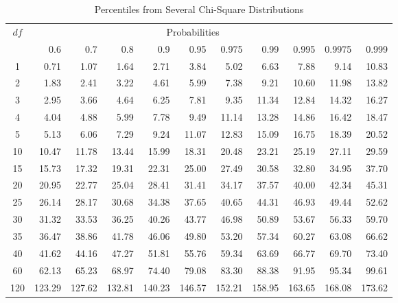\begin{table}[h]
 \caption{\label{AP:ChiSqProbTable} Percentiles from
Several Chi-Square Distributions}
\begin{tabular}{c|rrrrrrrrrr}
\hline   $df$ & \multicolumn{9}{c}{Probabilities} \\
         &        0.6 &        0.7 &        0.8 &        0.9 &       0.95 &      0.975 &       0.99 &      0.995 &     0.9975 &      0.999 \\
\hline
         1 &       0.71 &       1.07 &       1.64 &       2.71 &       3.84 &       5.02 &       6.63 &       7.88 &       9.14 &      10.83 \\
         2 &       1.83 &       2.41 &       3.22 &       4.61 &       5.99 &       7.38 &       9.21 &      10.60 &      11.98 &      13.82 \\
         3 &       2.95 &       3.66 &       4.64 &       6.25 &       7.81 &       9.35 &      11.34 &      12.84 &      14.32 &      16.27 \\
         4 &       4.04 &       4.88 &       5.99 &       7.78 &       9.49 &      11.14 &      13.28 &      14.86 &      16.42 &      18.47 \\
         5 &       5.13 &       6.06 &       7.29 &       9.24 &      11.07 &      12.83 &      15.09 &      16.75 &      18.39 &      20.52 \\
\hline
        10 &      10.47 &      11.78 &      13.44 &      15.99 &      18.31 &      20.48 &      23.21 &      25.19 &      27.11 &      29.59 \\
        15 &      15.73 &      17.32 &      19.31 &      22.31 &      25.00 &      27.49 &      30.58 &      32.80 &      34.95 &      37.70 \\
        20 &      20.95 &      22.77 &      25.04 &      28.41 &      31.41 &      34.17 &      37.57 &      40.00 &      42.34 &      45.31 \\
        25 &      26.14 &      28.17 &      30.68 &      34.38 &      37.65 &      40.65 &      44.31 &      46.93 &      49.44 &      52.62 \\
        30 &      31.32 &      33.53 &      36.25 &      40.26 &      43.77 &      46.98 &      50.89 &      53.67 &      56.33 &      59.70 \\
        35 &      36.47 &      38.86 &      41.78 &      46.06 &      49.80 &      53.20 &      57.34 &      60.27 &      63.08 &      66.62 \\
        40 &      41.62 &      44.16 &      47.27 &      51.81 &      55.76 &      59.34 &      63.69 &      66.77 &      69.70 &      73.40 \\
\hline
        60 &      62.13 &      65.23 &      68.97 &      74.40 &      79.08 &      83.30 &      88.38 &      91.95 &      95.34 &      99.61 \\
       120 &     123.29 &     127.62 &     132.81 &     140.23 &     146.57 &     152.21 &     158.95 &     163.65 &     168.08 &     173.62 \\
\hline
\end{tabular}
\end{table}


